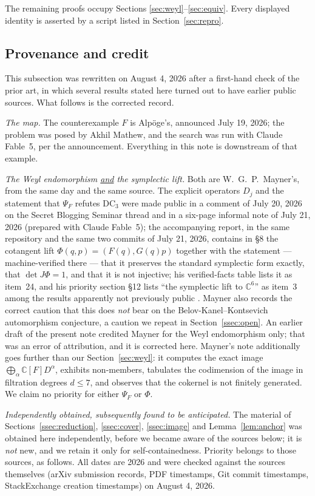 \documentclass[11pt]{amsart}
\newcommand{\CC}{\mathbb{C}}
\newcommand{\DC}{\mathrm{DC}}
\theoremstyle{plain}
\theoremstyle{definition}
\theoremstyle{remark}
\begin{document}
The remaining proofs occupy Sections
\ref{sec:weyl}--\ref{sec:equiv}. Every displayed identity is asserted by a
script listed in Section~\ref{sec:repro}.

\subsection{Provenance and credit}\label{ssec:credit}
This subsection was rewritten on August 4, 2026 after a first-hand check of
the prior art, in which several results stated here turned out to have
earlier public sources. What follows is the corrected record.

\emph{The map.} The counterexample $F$ is Alp\"oge's, announced July 19,
2026; the problem was posed by Akhil Mathew, and the search was run with
Claude Fable~5, per the announcement. Everything in this note is downstream
of that example.

\emph{The Weyl endomorphism \underline{and} the symplectic lift.} Both are
W.~G.~P.~Mayner's, from the same day and the same source. The explicit
operators $D_{j}$ and the statement that $\Psi_{F}$ refutes $\DC_{3}$ were
made public in a comment of July 20, 2026 on the Secret Blogging Seminar
thread \cite{Speyer26} and in a six-page informal note of July 21, 2026
(prepared with Claude Fable~5); the accompanying report, in the same
repository and the same two commits of July 21, 2026, contains in
\S8 the cotangent lift $\Phi(q,p)=(F(q),G(q)p)$ together with the
statement --- machine-verified there --- that it preserves the standard
symplectic form exactly, that $\det J\Phi=1$, and that it is not
injective; his verified-facts table lists it as item~24, and his priority
section \S12 lists ``the symplectic lift to $\CC^{6}$'' as item~3 among
the results apparently not previously public \cite{Mayner26}. Mayner also
records the correct caution that this does \emph{not} bear on the
Belov-Kanel--Kontsevich automorphism conjecture, a caution we repeat in
Section~\ref{ssec:open}. An earlier draft of the present note credited
Mayner for the Weyl endomorphism only; that was an error of attribution,
and it is corrected here. Mayner's note additionally goes further than our
Section~\ref{sec:weyl}: it computes the exact image
$\bigoplus_{\alpha}\CC[F]D^{\alpha}$, exhibits non-members, tabulates the
codimension of the image in filtration degrees $d\le7$, and observes that
the cokernel is not finitely generated. We claim no priority for either
$\Psi_{F}$ or $\Phi$.

\emph{Independently obtained, subsequently found to be anticipated.} The
material of Sections~\ref{ssec:reduction}, \ref{ssec:cover},
\ref{ssec:image} and Lemma~\ref{lem:anchor} was obtained here
independently, before we became aware of the sources below; it is
\emph{not} new, and we retain it only for self-containedness. Priority
belongs to those sources, as follows. All dates are 2026 and were checked
against the sources themselves (arXiv submission records, PDF timestamps,
Git commit timestamps, StackExchange creation timestamps) on August 4,
2026.
\end{document}
